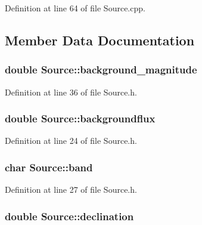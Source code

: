 Definition at line 64 of file Source.cpp.



\subsection{Member Data Documentation}
\hypertarget{classSource_af8077dd4bf90295d11680d6dbd0baea9}{
\subsubsection[{background\_\-magnitude}]{\setlength{\rightskip}{0pt plus 5cm}double {\bf Source::background\_\-magnitude}}}
\label{classSource_af8077dd4bf90295d11680d6dbd0baea9}


Definition at line 36 of file Source.h.

\hypertarget{classSource_ac6515686d4bbb766ae14e1360fdf1c97}{
\subsubsection[{backgroundflux}]{\setlength{\rightskip}{0pt plus 5cm}double {\bf Source::backgroundflux}}}
\label{classSource_ac6515686d4bbb766ae14e1360fdf1c97}


Definition at line 24 of file Source.h.

\hypertarget{classSource_a380447fc2b80c1b6bc5c2a8b31ed6b98}{
\subsubsection[{band}]{\setlength{\rightskip}{0pt plus 5cm}char {\bf Source::band}}}
\label{classSource_a380447fc2b80c1b6bc5c2a8b31ed6b98}


Definition at line 27 of file Source.h.

\hypertarget{classSource_acd65dbd79034b6bd27ce7bea9cddf80b}{
\subsubsection[{declination}]{\setlength{\rightskip}{0pt plus 5cm}double {\bf Source::declination}}}
\label{classSource_acd65dbd79034b6bd27ce7bea9cddf80b}


